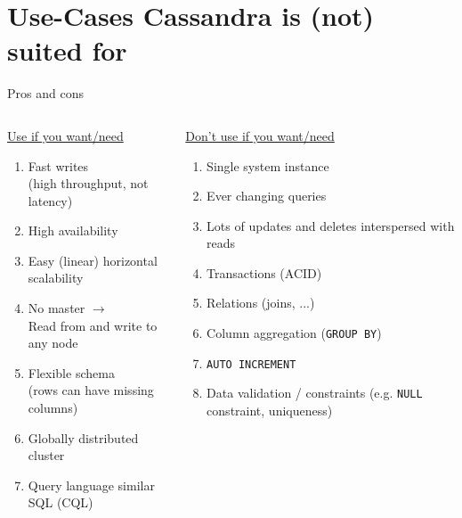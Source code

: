 \documentclass[
  10pt
]{beamer}
\begin{document}
\section{Use-Cases Cassandra is (not) suited for}  %
\begin{frame}{Pros and cons}
  \begin{columns}[T]
    \onslide<+->
    \begin{column}{0.55\textwidth}
      \underline{Use if you want/need}

      \begin{enumerate}[\textbf{\textcolor{aswe-data}{+}}]
        \item<+-> Fast writes \\ (high throughput, not latency)
        \item<+-> High availability
        \item<+-> Easy (linear) horizontal scalability
        \item<+-> No master $\rightarrow$ \\ Read from and write to any node
        \item<+-> Flexible schema \\ (rows can have missing columns)
        \item<+-> Globally distributed cluster
        \item<+-> Query language similar SQL (CQL)
      \end{enumerate}
    \end{column}

    \onslide<+->
    \begin{column}{0.45\textwidth}
      \underline{Don't use if you want/need}

      \begin{enumerate}[\textbf{\textcolor{aswe-preferences}{-}}]
        \item<+-> Single system instance
        \item<+-> Ever changing queries
        \item<+-> Lots of updates and deletes interspersed with reads
        \item<+-> Transactions (ACID)
        \item<+-> Relations (joins, ...)
        \item<+-> Column aggregation (\lstinline{GROUP BY})
        \item<+-> \lstinline{AUTO INCREMENT}
        \item<+-> Data validation / constraints (e.g. \lstinline{NULL} constraint, uniqueness)
      \end{enumerate}
    \end{column}
  \end{columns}
\end{frame}
\end{document}
